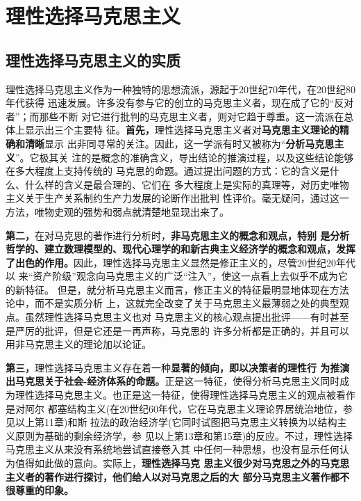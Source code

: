 \chapter{理性选择马克思主义}

\section{理性选择马克思主义的实质}

理性选择马克思主义作为一种独特的思想流派，源起于20世纪70年代，在20世纪80年代获得
迅速发展。许多没有参与它的创立的马克思主义者，现在成了它的“反对者”；而那些不断
对它进行批判的马克思主义者，则对它趋于尊重。这一流派在总体上显示出三个主要特
征。\textbf{首先，}理性选择马克思主义者对\textbf{马克思主义理论的精确和清晰}显示
出非同寻常的关注。因此，这一学派有时又被称为“\textbf{分析马克思主义}”。它极其关
注的是概念的准确含义，导出结论的推演过程，以及这些结论能够在多大程度上支持传统的
马克思的命题。通过提出问题的方式：它的含义是什么、什么样的含义是最合理的、它们在
多大程度上是实际的真理等，对历史唯物主义关于生产关系制约生产力发展的论断作出批判
性评价。毫无疑问，通过这一方法，唯物史观的强势和弱点就清楚地显现出来了。

\textbf{第二，}在对马克思的著作进行分析时，\textbf{非马克思主义的概念和观点，特别
  是分析哲学的、建立数理模型的、现代心理学的和新古典主义经济学的概念和观点，发挥
  了出色的作用。}因此，理性选择马克思主义显然是修正主义的，尽管20世纪20年代以
来“资产阶级”观念向马克思主义的广泛“注入”，使这一点看上去似乎不成为它的新特征。
但是，就分析马克思主义而言，修正主义的特征最明显地体现在方法论中，而不是实质分析
上，这就完全改变了关于马克思主义最薄弱之处的典型观点。虽然理性选择马克思主义也对
马克思主义的核心观点提出批评——有时甚至是严厉的批评，但是它还是一再声称，马克思的
许多分析都是正确的，并且可以用非马克思主义的理论加以论证。

\textbf{第三，}理性选择马克思主义存在着一种\textbf{显著的倾向，即以决策者的理性行
  为推演出马克思关于社会-经济体系的命题。}正是这一特征，使得分析马克思主义同时成
为理性选择马克思主义。也正是这一特征，使得理性选择马克思主义的观点被看作是对阿尔
都塞结构主义(在20世纪60年代，它在马克思主义理论界居统治地位，参见以上第11章)和斯
拉法的政治经济学(它同时试图把马克思主义转换为以结构主义原则为基础的剩余经济学，参
见以上第13章和第15章)的反应。不过，理性选择马克思主义从来没有系统地尝试直接卷入其
中任何一种思想，也没有显示任何认为值得如此做的意向。实际上，\textbf{理性选择马克
  思主义很少对马克思之外的马克思主义者的著作进行探讨，他们给人以对马克思之后的大
  部分马克思主义著作都不很尊重的印象。}

